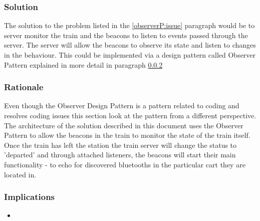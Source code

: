 \iffalse

	Therefore there is a clash of requirements which can be solved by implementing a version of a design pattern called the Observer Pattern configured to suit the needs to both be energy efficient and fault-proof. 

	This however creates an issue that the beacons should be allowed to operate on their own and they should also monitor the state of the train.
 \fi


\subsubsection{Solution} 
	The solution to the problem listed in the \ref{observerP:issue} paragraph would be to server monitor the train and the beacons to listen to events passed through the server. The server will allow the beacons to observe its state and listen to changes in the behaviour. This could be implemented via a design pattern called Observer Pattern explained in more detail in paragraph \ref{observerP:rationale}


\subsubsection{Rationale} \label{observerP:rationale}
	Even though the Observer Design Pattern is a pattern related to coding and resolves coding issues this section look at the pattern from a different perspective. The architecture of the solution described in this document uses the Observer Pattern to allow the beacons in the train to monitor the state of the train itself. Once the train has left the station the train server will change the status to 'departed' and through attached listeners, the beacons will start their main functionality - to echo for discovered bluetooths in the particular cart they are located in.

\subsubsection{Implications}
\begin{itemize}
  \item 
\end{itemize}

